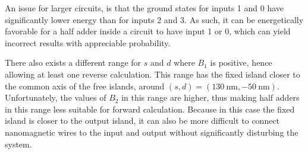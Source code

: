 \documentclass[twocolumn]{phdsymp}
\begin{document}
An issue for larger circuits, is that the ground states for inputs 1 and 0 have significantly lower energy than for inputs 2 and 3. As such, it can be energetically favorable for a half adder inside a circuit to have input 1 or 0, which can yield incorrect results with appreciable probability. \par
There also exists a different range for $s$ and $d$ where $B_1$ is positive, hence allowing at least one reverse calculation. This range has the fixed island closer to the common axis of the free islands, around $(s,d) = (\SI{130}{\nano\metre}, \SI{-50}{\nano\metre})$. Unfortunately, the values of $B_2$ in this range are higher, thus making half adders in this range less suitable for forward calculation. Because in this case the fixed island is closer to the output island, it can also be more difficult to connect nanomagnetic wires to the input and output without significantly disturbing the system.
\end{document}
